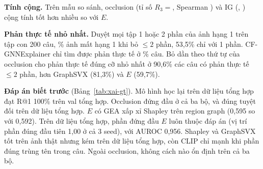 \textbf{Tính cộng.} Trên mẫu so sánh, occlusion (tỉ số $R_3={}$, Spearman ) và IG
(, ) cộng tính tốt hơn nhiều so với $E$.

\textbf{Phản thực tế nhỏ nhất.} Duyệt mọi tập 1 hoặc 2 phần của ảnh hạng 1 trên tập con 200 câu, \% ảnh mất
hạng 1 khi bỏ $\le 2$ phần, 53,5\% chỉ với 1 phần. CF-GNNExplainer chỉ tìm được phản thực tế ở \% câu. Bỏ
dần theo thứ tự của occlusion cho phản thực tế đúng cỡ nhỏ nhất ở 90,6\% các câu có phản thực tế $\le 2$ phần, hơn GraphSVX
(81,3\%) và $E$ (59,7\%).

\textbf{Đáp án biết trước} (Bảng~\ref{tab:xai-gt}). Mô hình học lại trên dữ liệu tổng hợp đạt R@1 100\% trên val tổng hợp.
Occlusion đứng đầu ở cả ba bộ, và đúng tuyệt đối trên dữ liệu tổng hợp. $E$ có GEA xấp xỉ Shapley trên region graph (0,595 so
với 0,592). Trên dữ liệu tổng hợp, phần đứng đầu $E$ luôn thuộc đáp án (vị trí phần đúng đầu tiên 1,00 ở cả 3 seed), với
AUROC 0,956. Shapley và GraphSVX tốt trên ảnh thật nhưng kém
trên dữ liệu tổng hợp, còn CLIP chỉ mạnh khi phần đúng trùng tên trong câu. Ngoài occlusion, không cách nào ổn định trên cả
ba bộ.


